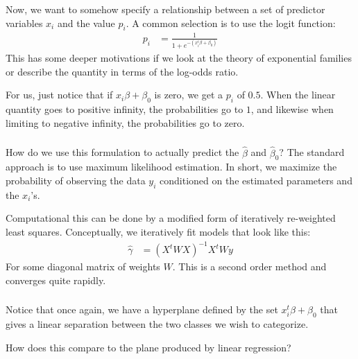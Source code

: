 \documentclass[xetex,mathserif,serif,aspectratio=169]{beamer}
\begin{document}
\begin{frame}[fragile] \frametitle{} \oldB \small

\textbf{}

Now, we want to somehow specify a relationship between a set of predictor
variables $x_i$ and the value $p_i$. A common selection is to use the logit
function:
\begin{align*}
p_i &= \frac{1}{1 + e^{-(x_i^t \beta + \beta_0)}}
\end{align*}
This has some deeper motivations if we look at the theory of exponential families
or describe the quantity in terms of the log-odds ratio.

For us, just notice that if $x_i \beta + \beta_0$ is zero, we get a $p_i$ of
$0.5$. When the linear quantity goes to positive infinity, the probabilities
go to $1$, and likewise when limiting to negative infinity, the probabilities go
to zero.

\end{frame}


\begin{frame}[fragile] \frametitle{} \oldB \small

\textbf{}

How do we use this formulation to actually predict the $\widehat{\beta}$ and
$\widehat{\beta}_0$? The standard approach is to use maximum likelihood estimation.
In short, we maximize the probability of observing the data $y_i$ conditioned on
the estimated parameters and the $x_i$'s.

\pause Computational this can be done by a modified form of iteratively re-weighted least
squares. Conceptually, we iteratively fit models that look like this:
\begin{align*}
\widehat{\gamma} &= (X^t W X)^{-1} X^t W y
\end{align*}
For some diagonal matrix of weights $W$. This is a second order method and converges quite
rapidly.

\end{frame}

\begin{frame}[fragile] \frametitle{} \oldB \small

\textbf{}

Notice that once again, we have a hyperplane defined by the set $x_i^t \beta + \beta_0$
that gives a linear separation between the two classes we wish to categorize.

How does this compare to the plane produced by linear regression?

\end{frame}
\end{document}
